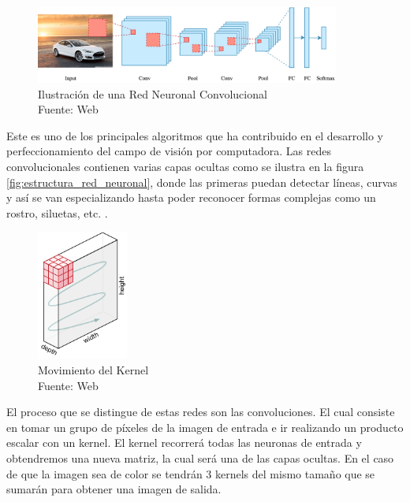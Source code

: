 \begin{figure}[H]
    \begin{center}
        \includegraphics[width=10cm]{img/capitulo_2/convolucional.png}
    \end{center}
    \caption{Ilustración de una Red Neuronal Convolucional
        \\Fuente: Web}
    \label{fig:red_neuronal_convolucional}
\end{figure}

Este es uno de los principales algoritmos que ha contribuido en el desarrollo y perfeccionamiento del campo de visión por computadora. Las redes convolucionales contienen varias capas ocultas como se ilustra en la figura \ref{fig:estructura_red_neuronal}, donde las primeras puedan detectar líneas, curvas y así se van especializando hasta poder reconocer formas complejas como un rostro, siluetas, etc. \cite{convolutional:ia}. \\

\begin{figure}[H]
    \begin{center}
        \includegraphics[width=3cm]{img/capitulo_2/kernel.png}
    \end{center}
    \caption{Movimiento del Kernel
        \\Fuente: Web}
    \label{fig:kernel}
\end{figure}

El proceso que se distingue de estas redes son las convoluciones. El cual consiste en tomar un grupo de píxeles de la imagen de entrada e ir realizando un producto escalar con un kernel. El kernel recorrerá todas las neuronas de entrada y obtendremos una nueva matriz, la cual será una de las capas ocultas. En el caso de que la imagen sea de color se tendrán 3 kernels del mismo tamaño que se sumarán para obtener una imagen de salida.\\

